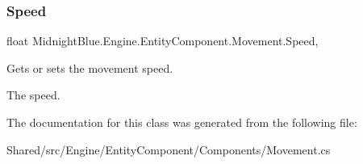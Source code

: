 \subsubsection{\texorpdfstring{Speed}{Speed}}
{\footnotesize\ttfamily float Midnight\+Blue.\+Engine.\+Entity\+Component.\+Movement.\+Speed\hspace{0.3cm}{\ttfamily [get]}, {\ttfamily [set]}}



Gets or sets the movement speed. 

The speed.

The documentation for this class was generated from the following file\+:\begin{DoxyCompactItemize}
\item 
Shared/src/\+Engine/\+Entity\+Component/\+Components/Movement.\+cs\end{DoxyCompactItemize}
